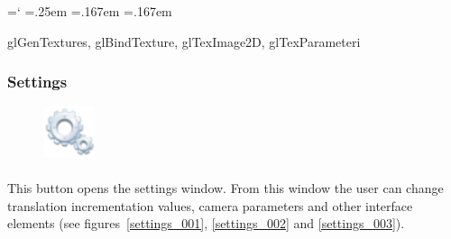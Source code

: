 \documentclass[12pt]{report}
\DeclareRobustCommand*{\ttfamily}{
  \origttfamily
  \hyphenchar\font=`\-\relax
  \fontdimen3\font=.25em\relax
  \fontdimen4\font=.167em\relax
  \fontdimen7\font=.167em\relax
}
\newenvironment{code}{\ttfamily}{}
\begin{document}
	\begin{code}
	glGenTextures, glBindTexture, glTexImage2D, glTexParameteri
	\end{code}



\subsubsection{Settings}

\begin{figure}
\vspace{-20pt}
\includegraphics[width=1.5cm]{icons/settings.png}
\end{figure}
\paragraph{}
	This button opens the settings window. From this window the user can change translation incrementation values, camera parameters and other interface elements (see figures~\ref{settings_001}, \ref{settings_002} and \ref{settings_003}).
\end{document}
